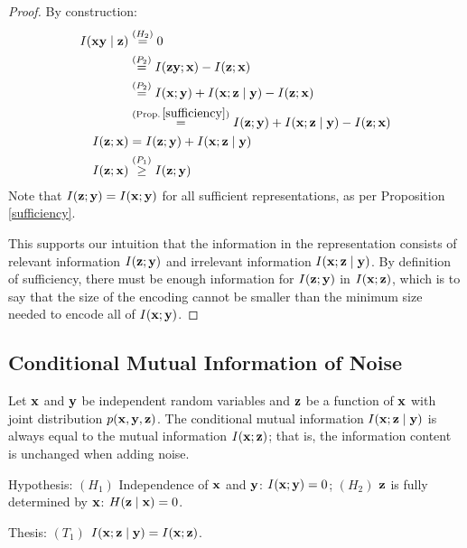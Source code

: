 \begin{proof}
By construction:
\begin{align*} I({\mathbf{x}} {\mathbf{y}} \mid {\mathbf{z}}) &\stackrel{\left(H_2\right)}{=} 0 \\ &\stackrel{\left(P_2\right)}{=} I({\mathbf{z}} {\mathbf{y}}; {\mathbf{x}}) - I({\mathbf{z}}; {\mathbf{x}}) \\ &\stackrel{\left(P_2\right)}{=} I({\mathbf{x}}; {\mathbf{y}}) + I({\mathbf{x}}; {\mathbf{z}} \mid {\mathbf{y}}) - I({\mathbf{z}}; {\mathbf{x}}) \\ &\stackrel{(\text{Prop.}\,\ref{sufficiency})}{=} I({\mathbf{z}}; {\mathbf{y}}) + I({\mathbf{x}}; {\mathbf{z}} \mid {\mathbf{y}}) - I({\mathbf{z}};{\mathbf{x}}) \\ I({\mathbf{z}};{\mathbf{x}}) &= I({\mathbf{z}};{\mathbf{y}}) + I({\mathbf{x}}; {\mathbf{z}} \mid {\mathbf{y}}) \\ I({\mathbf{z}};{\mathbf{x}}) &\stackrel{\left(P_1\right)}{\geq} I({\mathbf{z}}; {\mathbf{y}}) \end{align*}
Note that $I({\mathbf{z}}; {\mathbf{y}}) = I({\mathbf{x}}; {\mathbf{y}})$ for all sufficient representations, as per Proposition \ref{sufficiency}.

This supports our intuition that the information in the representation consists of relevant information $I({\mathbf{z}};{\mathbf{y}})$ and irrelevant information $I({\mathbf{x}}; {\mathbf{z}} \mid {\mathbf{y}})$. By definition of sufficiency, there must be enough information for $I({\mathbf{z}}; {\mathbf{y}})$ in $I({\mathbf{x}}; {\mathbf{z}})$, which is to say that the size of the encoding cannot be smaller than the minimum size needed to encode all of $I({\mathbf{x}}; {\mathbf{y}})$.
\end{proof}

\subsection{Conditional Mutual Information of Noise}
\label{app:infonoise}

\begin{lemma}
Let ${\mathbf{x}}$ and ${\mathbf{y}}$ be independent random variables and ${\mathbf{z}}$ be a function of ${\mathbf{x}}$ with joint distribution $p({\mathbf{x}}, {\mathbf{y}}, {\mathbf{z}})$. The conditional mutual information $I({\mathbf{x}}; {\mathbf{z}} \mid {\mathbf{y}})$ is always equal to the mutual information $I({\mathbf{x}}; {\mathbf{z}})$; that is, the information content is unchanged when adding noise.

Hypothesis: $(H_1)$ Independence of ${\mathbf{x}}$ and ${\mathbf{y}}$: $I({\mathbf{x}};{\mathbf{y}}) = 0$; $(H_2)$ ${\mathbf{z}}$ is fully determined by ${\mathbf{x}}$: $H({\mathbf{z}} \mid {\mathbf{x}}) = 0$.

Thesis: $(T_1)$ $I({\mathbf{x}}; {\mathbf{z}} \mid {\mathbf{y}}) = I({\mathbf{x}}; {\mathbf{z}})$.
\label{infonoise}
\end{lemma}

